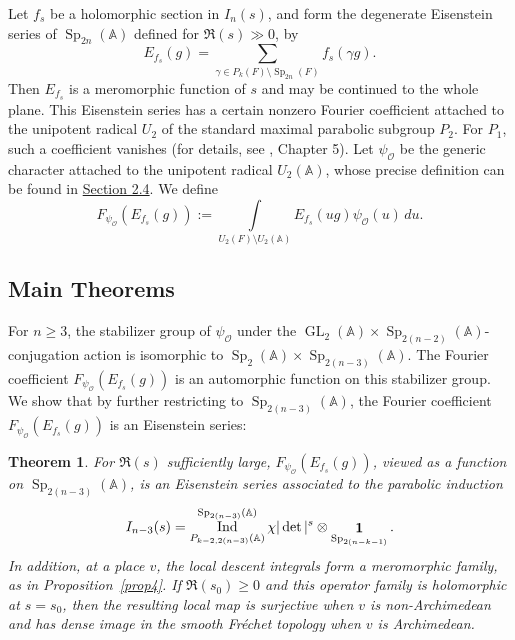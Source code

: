 \documentclass[11pt,notitlepage]{amsart}
\newtheorem{theorem}{Theorem}[section]
\theoremstyle{definition}
\theoremstyle{remark}
\newcommand{\calO}{\mathcal{O}}
\newcommand{\bbA}{\mathbb{A}}
\DeclareMathOperator{\id}{{\bf 1}}
\DeclareMathOperator{\GL}{GL}
\DeclareMathOperator{\Sp}{Sp}
\DeclareMathOperator{\Ind}{Ind}
\begin{document}
Let $f_s$ be a holomorphic section in $I_n(s)$, and form the degenerate Eisenstein series of $\Sp_{2n}(\bbA)$ defined for $\Re(s)\gg0$, by
\begin{equation}\label{eis1}
  E_{f_s}(g) = \sum_{\gamma\in P_k(F)\setminus \Sp_{2n}(F)}f_s(\gamma g).
\end{equation}
Then $E_{f_s}$ is a meromorphic function of $s$ and may be continued to the whole plane. This Eisenstein series has a certain nonzero Fourier coefficient attached to the unipotent radical $U_2$ of the standard maximal parabolic subgroup $P_2$. For $P_1$, such a coefficient vanishes (for details, see \cite{GIN06}, Chapter 5). Let $\psi_\calO$ be the generic character attached to the unipotent radical $U_2(\bbA)$, whose precise definition can be found in \hyperref[sec204]{Section 2.4}. We define
\begin{equation}\label{fc}
  F_{\psi_\calO}(E_{f_s}(g)) := \int\limits_{U_{2}(F)\setminus U_{2}(\bbA)}E_{f_s}(ug)\psi_{\calO}(u)\,du.
\end{equation}

\subsection{Main Theorems} For $n\geq3$, the stabilizer group of $\psi_{\calO}$ under the $\GL_2(\bbA)\times \Sp_{2(n-2)}(\bbA)$-conjugation action is isomorphic to $\Sp_{2}(\bbA) \times \Sp_{2(n-3)}(\bbA)$. The Fourier coefficient $F_{\psi_\calO}(E_{f_s}(g))$ is an automorphic function on this stabilizer group. We show that by further restricting to $\Sp_{2(n-3)}(\bbA)$, the Fourier coefficient $F_{\psi_\calO}(E_{f_s}(g))$ is an Eisenstein series:
\begin{theorem}\label{thm101}
 For $\Re(s)$ sufficiently large, $F_{\psi_\calO}(E_{f_s}(g))$, viewed as a function on $\Sp_{2(n-3)}(\bbA)$, is an Eisenstein series associated to the parabolic induction 
  \begin{equation}\label{indrep2}
  I_{n-3}(s) = \Ind_{P_{k-2,2(n-3)}(\bbA)}^{\Sp_{2(n-3)}(\bbA)} \chi|\det|^{s}\otimes \id_{\Sp_{2(n-k-1)}}.
  \end{equation}
In addition, at a place $v$, the local
descent integrals form a meromorphic family, as in Proposition~\ref{prop4}. If $\Re(s_0)\geq 0$ and this operator family is holomorphic at $s=s_0$, then the resulting local map is surjective when $v$ is non-Archimedean and has dense image in the smooth Fréchet topology
when $v$ is Archimedean.
\end{theorem} 
\end{document}
